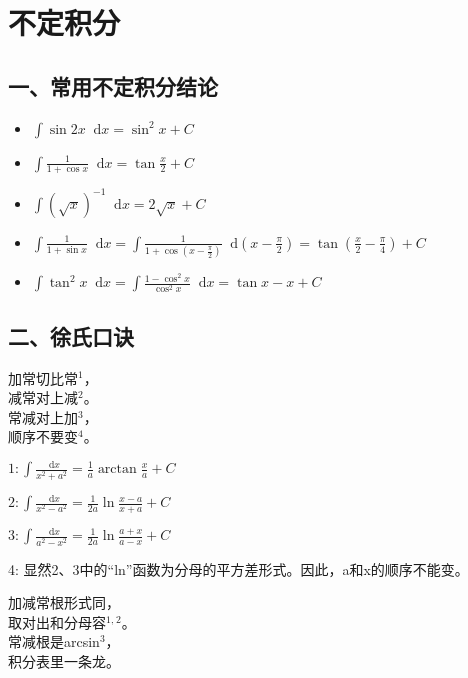 \documentclass[b5paper]{ctexart}
\renewcommand{\d}{\mathop{}\!\mathrm{d}}
\begin{document}
	
	\newpage
	\section{不定积分}
	
	\subsection*{一、常用不定积分结论}
	
	\begin{itemize}
		\item $\int \sin 2x  \d x= \sin^2 x + C$
		
		\item $\int \frac{1}{1 + \cos x} \d x = \tan \frac{x}{2} + C$
		
		\item $\int (\sqrt{x})^{-1} \d x = 2 \sqrt{x} + C$
		
		\item $\int \frac{1}{1 + \sin x} \d x = \int \frac{1}{1 + \cos (x - \frac{\pi}{2})} \d (x - \frac{\pi}{2}) = \tan (\frac{x}{2} - \frac{\pi}{4}) + C$
		
		\item $\int \tan ^2 x \d x = \int \frac{1 - \cos^2 x}{\cos ^2 x} \d x = \tan x - x + C$
	\end{itemize}
	
	\subsection*{二、徐氏口诀}
	
	\begin{center}
		加常切比常$^1$，\\
		减常对上减$^2$。\\
		常减对上加$^3$，\\
		顺序不要变$^4$。
	\end{center}
	
	$1: \int \frac{\d x}{x^2 + a^2} = \frac{1}{a} \arctan \frac{x}{a} + C$
	
	$2: \int \frac{\d x}{x^2 - a^2} = \frac{1}{2a} \ln \frac{x - a}{x + a} + C$
	
	$3: \int \frac{\d x}{a^2 - x^2} = \frac{1}{2a} \ln \frac{a + x}{a - x} + C$
	
	4: 显然2、3中的“ln”函数为分母的平方差形式。因此，a和x的顺序不能变。
	
	
	\begin{center}
		加减常根形式同，\\
		取对出和分母容$^{1,}$$^2$。\\
		常减根是arcsin$^3$，\\
		积分表里一条龙。
	\end{center}
\end{document}
